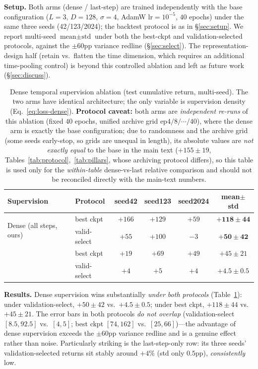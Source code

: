 \documentclass[a4paper,11pt]{article}
\begin{document}
\textbf{Setup.} Both arms (dense / last-step) are trained independently
with the base configuration ($L{=}3$, $D{=}128$, $\sigma{=}4$, AdamW
$\text{lr}{=}10^{-5}$, $40$ epochs) under the same three seeds (42/123/2024);
the backtest protocol is as in \S\ref{sec:setup}. We report multi-seed
$\text{mean}\pm\text{std}$ under both the best-ckpt and validation-selected
protocols, against the $\pm60$pp variance redline (\S\ref{sec:select}). The
representation-design half (retain vs.\ flatten the time dimension, which
requires an additional time-pooling control) is beyond this controlled ablation
and left as future work (\S\ref{sec:discuss}).

\begin{table}[H]
\centering
\caption{Dense temporal supervision ablation (test cumulative return,
multi-seed). The two arms have identical architecture; the only variable is
supervision density (Eq.~\eqref{eq:loss-dense}). \textbf{Protocol caveat:} both
arms are \emph{independent re-runs} of this ablation (fixed $40$ epochs, unified
archive grid ep$4/8/\cdots/40$), where the dense arm is exactly the base
configuration; due to randomness and the archive grid (some seeds early-stop,
so grids are unequal in length), its absolute values are \emph{not exactly
equal} to the base in the main text ($+155\pm19$,
Tables~\ref{tab:protocol},~\ref{tab:pillars}, whose archiving protocol differs),
so this table is used only for the \emph{within-table} dense-vs-last relative
comparison and should not be reconciled directly with the main-text numbers.}
\label{tab:abl-dense}
\begin{tabular}{llcccc}
\toprule
Supervision & Protocol & seed42 & seed123 & seed2024 & mean$\pm$std \\
\midrule
\multirow{2}{*}{Dense (all steps, ours)} & best ckpt & $+166$ & $+129$ & $+59$ & $\mathbf{+118\pm44}$ \\
                        & valid-select & $+55$ & $+100$ & $-3$ & $\mathbf{+50\pm42}$ \\
\addlinespace
\multirow{2}{*}{Last-step only}      & best ckpt & $+19$ & $+69$ & $+49$ & $+45\pm21$ \\
       & valid-select & $+4$ & $+5$ & $+4$ & $+4.5\pm0.5$ \\
\bottomrule
\end{tabular}
\end{table}

\textbf{Results.} Dense supervision wins substantially \emph{under both
protocols} (Table~\ref{tab:abl-dense}): under validation-select, $+50\pm42$ vs.\
$+4.5\pm0.5$; under best ckpt, $+118\pm44$ vs.\ $+45\pm21$. The error bars in
both protocols \emph{do not overlap} (validation-select $[8.5,92.5]$ vs.\
$[4,5]$; best ckpt $[74,162]$ vs.\ $[25,66]$)---the advantage of dense
supervision exceeds the $\pm60$pp variance redline and is a genuine effect
rather than noise. Particularly striking is the last-step-only row: its three
seeds' validation-selected returns sit stably around $+4\%$ (std only $0.5$pp),
\emph{consistently} low.
\end{document}

